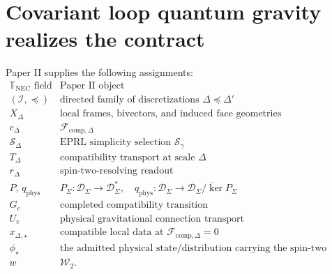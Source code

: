 \documentclass[11pt]{article}
\newcommand{\NEC}{\mathbb T_{\mathrm{NEC}}}
\begin{document}
\section{Covariant loop quantum gravity realizes the contract}

Paper II supplies the following assignments:
\[
\begin{array}{c|c}
\NEC\text{ field}&\text{Paper II object}\\
\hline
(\mathcal I,\preceq)&\text{directed family of discretizations }\Delta\preceq\Delta'\\
X_\Delta&\text{local frames, bivectors, and induced face geometries}\\
c_\Delta&\mathcal F_{\mathrm{comp},\Delta}\\
\mathcal S_\Delta&\text{EPRL simplicity selection }\mathcal S_\gamma\\
T_\Delta&\text{compatibility transport at scale }\Delta\\
r_\Delta&\text{spin-two-resolving readout}\\
P,\,q_{\mathrm{phys}}&P_\Sigma:\mathcal D_\Sigma\to\mathcal D_\Sigma^{*},\quad
q_{\mathrm{phys}}:\mathcal D_\Sigma\to\overline{\mathcal D_\Sigma/\ker P_\Sigma}\\
G_e&\text{completed compatibility transition}\\
U_e&\text{physical gravitational connection transport}\\
x_{\Delta,\star}&\text{compatible local data at }\mathcal F_{\mathrm{comp},\Delta}=0\\
\phi_\star&\text{the admitted physical state/distribution carrying the spin-two witness}\\
w&\mathcal W_2.
\end{array}
\]
\end{document}

